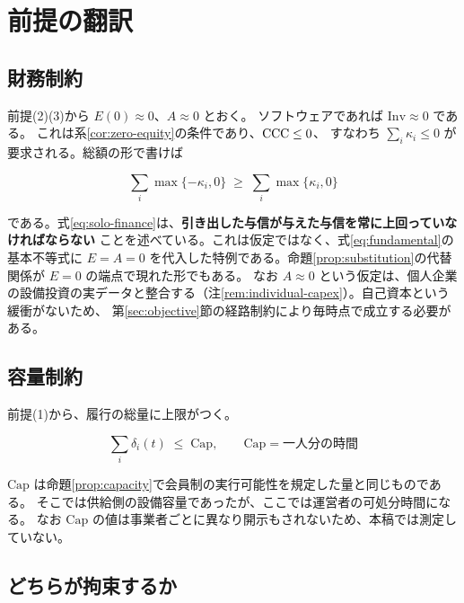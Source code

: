 \section{前提の翻訳}

\subsection{財務制約}

前提(2)(3)から $E(0)\approx 0$、$A\approx 0$ とおく。
ソフトウェアであれば $\mathrm{Inv}\approx 0$ である。
これは系\ref{cor:zero-equity}の条件であり、$\mathrm{CCC}\leq 0$、
すなわち $\sum_i\kappa_i\leq 0$ が要求される。総額の形で書けば

\begin{equation}
\sum_{i} \max\{-\kappa_i,0\} \;\geq\; \sum_{i} \max\{\kappa_i,0\}
\label{eq:solo-finance}
\end{equation}

である。式\eqref{eq:solo-finance}は、\textbf{引き出した与信が与えた与信を常に上回っていなければならない}
ことを述べている。これは仮定ではなく、式\eqref{eq:fundamental}の基本不等式に
$E=A=0$ を代入した特例である。命題\ref{prop:substitution}の代替関係が
$E=0$ の端点で現れた形でもある。
なお $A\approx 0$ という仮定は、個人企業の設備投資の実データと整合する（注\ref{rem:individual-capex}）。自己資本という緩衝がないため、
第\ref{sec:objective}節の経路制約により毎時点で成立する必要がある。

\subsection{容量制約}

前提(1)から、履行の総量に上限がつく。

\begin{equation}
\sum_{i} \delta_i(t) \;\leq\; \mathrm{Cap}, \qquad \mathrm{Cap} = \text{一人分の時間}
\label{eq:solo-capacity}
\end{equation}

$\mathrm{Cap}$ は命題\ref{prop:capacity}で会員制の実行可能性を規定した量と同じものである。
そこでは供給側の設備容量であったが、ここでは運営者の可処分時間になる。
なお $\mathrm{Cap}$ の値は事業者ごとに異なり開示もされないため、本稿では測定していない。

\subsection{どちらが拘束するか}
\label{sec:which-binds}

